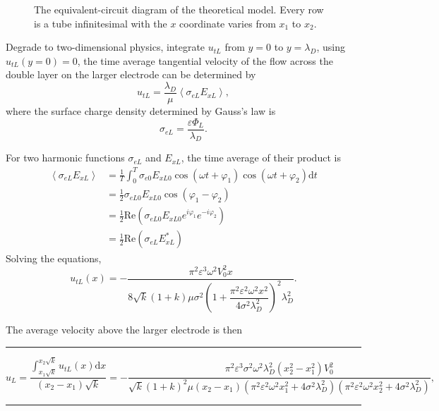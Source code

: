 \documentclass[journal,svgnames,twocolumn,x11names]{IEEEtran}
\begin{document}
\begin{figure}[htp]
    \centering
    
    \caption{The equivalent-circuit diagram of the theoretical model. Every row is a tube infinitesimal with the $x$ coordinate varies from $x_1$ to $x_2$.}
    \label{fig:2}
    \vspace{-0.63cm}
\end{figure}
Degrade to two-dimensional physics, integrate $u_{tL}$ from $y=0$ to $y=\lambda_D$, using $u_{tL}(y=0)=0$, the time average tangential velocity of the flow across the double layer on the larger electrode can be determined by
\begin{equation}
    u_{tL}=\frac{\lambda_D}{\mu}\left<\sigma_{eL}E_{xL}\right>,
\end{equation}
where the surface charge density determined by Gauss's law is
\begin{equation}
    \sigma_{eL}=\frac{\varepsilon\Phi_L}{\lambda_D}.
\end{equation}

For two harmonic functions $\sigma_{eL}$ and $E_{xL}$, the time average of their product is
\begin{equation}
    \begin{aligned}
        \left<\sigma_{eL}E_{xL}\right>&=\frac{1}{T}\int_0^T{\sigma_{e0}E_{xL0}\cos{(\omega t+\varphi_1)}\cos{(\omega t+\varphi_2)}\mathrm{d}t}\\
        &=\frac{1}{2}\sigma_{eL0}E_{xL0}\cos{(\varphi_1-\varphi_2)}\\
        &=\frac{1}{2}\mathrm{Re}\left(\sigma_{eL0}E_{xL0}e^{i\varphi_1}e^{-i\varphi_2}\right)\\
        &=\frac{1}{2}\mathrm{Re}\left(\sigma_{eL}E_{xL}^*\right)
    \end{aligned}
\end{equation}
Solving the equations,
\begin{equation}
    u_{tL}(x)=-\frac{\pi^2\varepsilon^3\omega^2V_0^2x}{8\sqrt{k}(1+k)\mu\sigma^2\left(1+\dfrac{\pi^2\varepsilon^2\omega^2x^2}{4\sigma^2\lambda_D^2}\right)^2\lambda_D^2}.
\end{equation}

The average velocity above the larger electrode is then
\newpage

\begin{strip}
    \rule{0.5\textwidth}{.4pt}
    \begin{equation}
        u_L=\frac{\int_{x_1\sqrt{k}}^{x_2\sqrt{k}}{u_{tL}(x)\mathrm{d}x}}{(x_2-x_1)\sqrt{k}}=-\frac{\pi^2\varepsilon^3\sigma^2\omega^2\lambda_D^2\left(x_2^2-x_1^2\right)V_0^2}{\sqrt{k}(1+k)^2\mu(x_2-x_1)\left(\pi^2\varepsilon^2\omega^2x_1^2+4\sigma^2\lambda_D^2\right)\left(\pi^2\varepsilon^2\omega^2x_2^2+4\sigma^2\lambda_D^2\right)},
    \end{equation}
    \hspace{0.5\textwidth}\rule{0.5\textwidth}{.4pt}
\end{strip}
\end{document}

